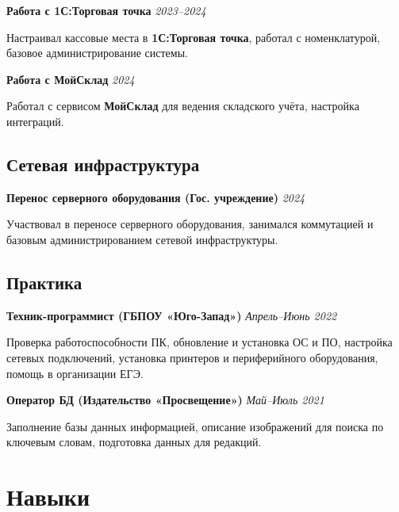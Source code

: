 \documentclass[10pt,a4paper]{article}
\newcommand{\projectEntry}[3]{\textbf{#1} \hfill \textit{#2}\par #3\par\vspace{0.3em}}
\begin{document}
\projectEntry{Работа с 1С:Торговая точка}{2023–2024}
{Настраивал кассовые места в \textbf{1С:Торговая точка}, работал с номенклатурой, базовое администрирование системы.}

\projectEntry{Работа с МойСклад}{2024}
{Работал с сервисом \textbf{МойСклад} для ведения складского учёта, настройка интеграций.}

\subsection{Сетевая инфраструктура}

\projectEntry{Перенос серверного оборудования (Гос. учреждение)}{2024}
{Участвовал в переносе серверного оборудования, занимался коммутацией и базовым администрированием сетевой инфраструктуры.}

\subsection{Практика}

\projectEntry{Техник-программист (ГБПОУ «Юго-Запад»)}{Апрель–Июнь 2022}
{Проверка работоспособности ПК, обновление и установка ОС и ПО, настройка сетевых подключений, установка принтеров и периферийного оборудования, помощь в организации ЕГЭ.}

\projectEntry{Оператор БД (Издательство «Просвещение»)}{Май–Июль 2021}
{Заполнение базы данных информацией, описание изображений для поиска по ключевым словам, подготовка данных для редакций.}

\makeEducation

\section{Навыки}
\end{document}
